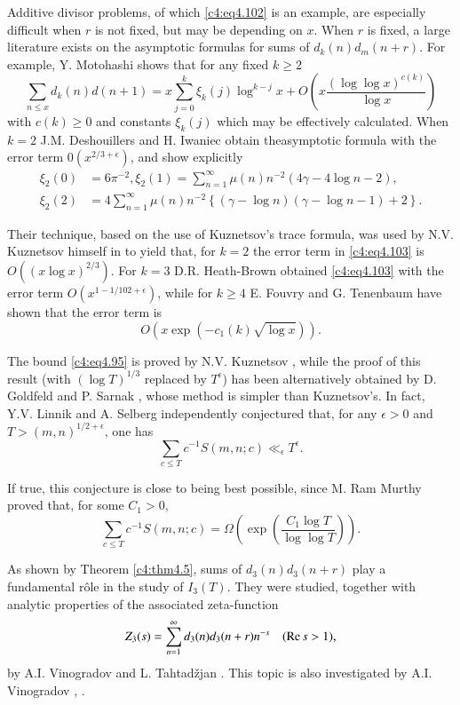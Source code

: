 Additive divisor problems, of which \eqref{c4:eq4.102} is an example,
are especially difficult when $r$ is not fixed, but may be depending
on $x$. When $r$ is fixed, a large literature exists on the asymptotic
formulas for sums of $d_k (n) d_m (n+r)$. For example, Y. Motohashi
\cite{Motohashi1} shows that for any fixed $k \geq 2$
\begin{equation}
  \sum_{n \leq x}d_k (n) d (n+1) = x \sum_{j=0}^k \xi_k (j)
  \log^{k-j}x + O \left(x \frac{(\log \log x)^{c(k)}}{\log x}
  \right) \label{c4:eq4.103} 
\end{equation}
with $c(k) \geq 0$ and constants $\xi_k (j)$ which may be effectively
calculated. When $k=2$ J.M. Deshouillers and H. Iwaniec \cite{Deshouillers and Iwaniec2} obtain
the\pageoriginale asymptotic formula with the error term
$0(x^{2/3+\epsilon})$, and show explicitly
\begin{align*}
  \xi_2 (0) & = 6 \pi^{-2}, \xi_2 (1) = \sum_{n=1}^\infty \mu (n)
  n^{-2} (4 \gamma -4 \log n-2),\\
  \xi_2 (2) & = 4 \sum_{n=1}^\infty \mu (n) n^{-2} \left\{(\gamma -
  \log n)(\gamma - \log n-1)+ 2 \right\}.
\end{align*}

Their technique, based on the use of Kuznetsov's trace formula, was
used by N.V. Kuznetsov himself in \cite{Kuznetsov4} to yield that, for $k=2$
the error term in \eqref{c4:eq4.103} is $O((x \log x)^{2/3})$. For
$k=3$ D.R. Heath-Brown \cite{Heath-Brown5} obtained \eqref{c4:eq4.103} with the
error term $O(x^{1-1/102+ \epsilon})$, while for $k \geq 4$ E. Fouvry
and G. Tenenbaum \cite{Fouvry and Tenenbaum1} have shown that the error term is 
$$
O\left(x \exp \left(- c_1 (k) \sqrt{\log x}\right)\right).
$$

The bound \eqref{c4:eq4.95} is proved by N.V. Kuznetsov \cite{Kuznetsov2}, while the proof of this result (with $(\log T)^{1/3}$ replaced by
$T^\epsilon$) has been alternatively obtained by D. Goldfeld and
P. Sarnak \cite{Goldfeld and Sarnak1}, whose method is simpler than Kuznetsov's. In fact,
Y.V. Linnik \cite{Linnik1} and A. Selberg \cite{Selberg2} independently conjectured
that, for any $\epsilon > 0$ and $T > (m, n)^{1/2+\epsilon}$, one has
$$
\sum_{c \leq T} c^{-1} S(m, n;c) \ll_\epsilon T^\epsilon.
$$

If true, this conjecture is close to being best possible, since M. Ram
Murthy \cite{Ram Murthy1} proved that, for some $C_1 > 0$,
$$
\sum_{c \leq T} c^{-1} S(m, n;c)= \Omega \left(\exp \left(\frac{C_1
  \log T}{\log \log T} \right) \right).
$$

As shown by Theorem \ref{c4:thm4.5}, sums of $d_3 (n) d_3 (n+r)$ play
a fundamental r\^ole in the study of $I_3 (T)$. They were studied,
together with analytic properties of the associated zeta-function
$$
Z_3 (s) = \sum_{n=1}^\infty d_3 (n) d_3 (n+r)n^{-s} \quad (\operatorname{Re} s> 1),
$$
by A.I. Vinogradov and L. Tahtad\v zjan \cite{Vinogradov and Tahtadzjan1}. This topic is also
investigated by A.I. Vinogradov \cite{Vinogradov1}, \cite{Vinogradov2}.


